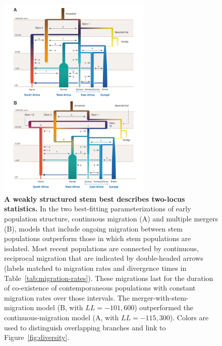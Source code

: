 \documentclass[]{article}
\begin{document}
\begin{figure}[t!]
    \centering
    \includegraphics[width=0.65\textwidth]{figures/best-fit-models}
    \caption{
        \textbf{A weakly structured stem best describes two-locus statistics.}
        In the two best-fitting parameterizations of early population structure,
        continuous migration (A) and multiple mergers (B), models
        that include ongoing migration between stem populations outperform
        those in which stem populations are isolated. Most recent populations are
        connected by continuous, reciprocal migration that are indicated by 
        double-headed arrows (labels matched to migration rates and divergence
        times in Table~\ref{tab:migration-rates}). These migrations last for the
        duration of co-existence of contemporaneous populations with constant
        migration rates over those intervals. The
        merger-with-stem-migration model (B, with  $LL=-101,600$) outperformed the
        continuous-migration model (A, with $LL=-115,300$).
        Colors are used to distinguish overlapping branches and link to
        Figure~\ref{fig:diversity}.}
    \label{fig:best-fit-models}
\end{figure}
\end{document}

